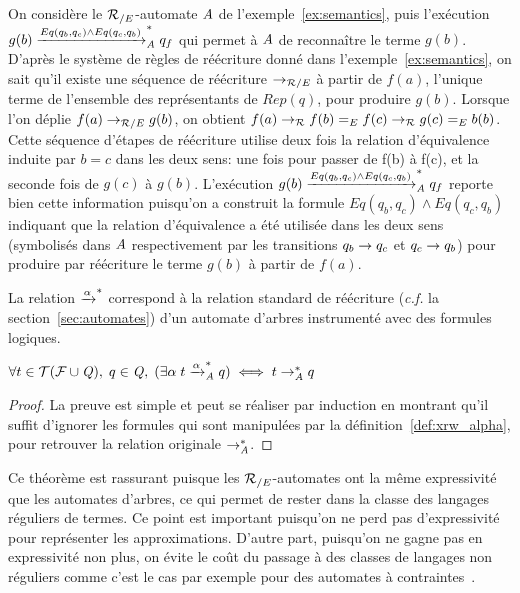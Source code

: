 \begin{example}
  On considère le ${\mathcal R_{/E}}$-automate $\mathit A$ de l'exemple~\ref{ex:semantics}, puis l'exécution
  $g(b) \xrightarrow{Eq(q_b, q_c) \land Eq (q_c, q_b)}^*_\mathit A q_f$ qui permet à $\mathit A$ de reconnaître le terme $g(b)$.
  D'après le système de règles de réécriture donné dans l'exemple~\ref{ex:semantics},
  on sait qu'il existe une séquence de réécriture $\rightarrow_{\mathcal R/E}$ à partir de $f(a)$, l'unique terme
  de l'ensemble des représentants de $Rep(q)$, pour produire $g(b)$.
  Lorsque l'on déplie $f(a) \rightarrow_{\mathcal R/E} g(b)$, on obtient 
  $f(a) \rightarrow_\mathcal R f(b) =_E f(c) \rightarrow_\mathcal R g(c) =_E b(b)$.
  Cette séquence d'étapes de réécriture utilise deux fois la relation d'équivalence induite
  par $b = c$ dans les deux sens: une fois pour passer de f(b) à f(c), et la seconde fois
  de $g(c)$ à $g(b)$.
  L'exécution $g(b) \xrightarrow{Eq(q_b, q_c) \land Eq (q_c, q_b)}^*_\mathit A q_f$
  reporte bien cette information puisqu'on a construit la formule $Eq(q_b, q_c) \land Eq (q_c, q_b)$ 
  indiquant que la relation d'équivalence a été utilisée dans les deux sens 
  (symbolisés dans $\mathit A$ respectivement par les transitions $q_b \rightarrow q_c$ et $q_c \rightarrow q_b$)
  pour produire par réécriture le terme $g(b)$ à partir de $f(a)$.
\end{example}


La relation $\xrightarrow{\alpha}^*$ correspond à la relation standard de réécriture 
(\textit{c.f.} la section~\ref{sec:automates}) d'un automate d'arbres instrumenté avec
des formules logiques.

\begin{theorem}\label{th:equiv}{\quad\quad
  $\forall t\in\mathcal{ T(F \cup \mathit Q)},\; q \in \mathit Q,\; (\exists \alpha\; t \xrightarrow{\alpha}^*_\mathit A q) \; \Longleftrightarrow \; t \rightarrow_\mathit A^* q$}
\end{theorem}

\begin{proof}
  La preuve est simple et peut se réaliser par induction en montrant qu'il suffit
  d'ignorer les formules qui sont manipulées par la définition~\ref{def:xrw_alpha},
  pour retrouver la relation originale $\rightarrow_\mathit A^*$. 
\end{proof}

Ce théorème est rassurant puisque les ${\mathcal R_{/E}}$-automates ont la même expressivité
que les automates d'arbres, ce qui permet de rester dans la classe des langages réguliers
de termes. Ce point est important puisqu'on ne perd pas d'expressivité pour représenter les
approximations. D'autre part, puisqu'on ne gagne pas en expressivité
non plus, on évite le coût du passage à des classes de langages non réguliers
comme c'est le cas par exemple pour des automates à contraintes~\cite{TATA}.


